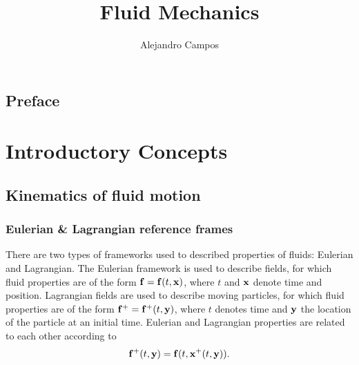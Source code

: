 \documentclass[oneside,a4paper,11pt]{report}
\title{Fluid Mechanics}
\author{Alejandro Campos}
\begin{document}
\maketitle
\tableofcontents

\chapter*{Preface}

\part{Introductory Concepts}                                                  %

%
\chapter{Kinematics of fluid motion}
%

\section{Eulerian \& Lagrangian reference frames}
There are two types of frameworks used to described properties of fluids: Eulerian and Lagrangian. The Eulerian framework is used to describe fields, for which fluid properties are of the form $\mathbf{f} = \mathbf{f}(t,\mathbf{x})$, where $t$ and $\mathbf{x}$ denote time and position. Lagrangian fields are used to describe moving particles, for which fluid properties are of the form $\mathbf{f}^+ = \mathbf{f}^+(t,\mathbf{y})$, where $t$ denotes time and $\mathbf{y}$ the location of the particle at an initial time. Eulerian and Lagrangian properties are related to each other according to 
\begin{equation}
\mathbf{f}^+(t,\mathbf{y})=\mathbf{f}(t,\mathbf{x}^+(t,\mathbf{y})).
\end{equation}
\end{document}
